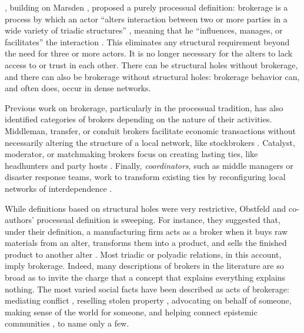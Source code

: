 \documentclass[
]{article}
\begin{document}
\textcite{obstfeldBrokerageProcessDecoupling2014}, building on Marsden \autocite*{marsdenBrokerageBehaviorRestricted1982}, proposed a purely processual definition: brokerage is a process by which an actor ``alters interaction between two or more parties in a wide variety of triadic structures'' \autocite[136]{obstfeldBrokerageProcessDecoupling2014}, meaning that he ``influences, manages, or facilitates'' the interaction \autocite[141]{obstfeldBrokerageProcessDecoupling2014}. This eliminates any structural requirement beyond the need for three or more actors. It is no longer necessary for the alters to lack access to or trust in each other. There can be structural holes without brokerage, and there can also be brokerage without structural holes: brokerage behavior can, and often does, occur in dense networks.

Previous work on brokerage, particularly in the processual tradition, has also identified categories of brokers depending on the nature of their activities. Middleman, transfer, or conduit brokers facilitate economic transactions without necessarily altering the structure of a local network, like stockbrokers \autocites[146]{stovelBrokerage2012}{spiroExtendedStructuresMediation2013}[141]{obstfeldBrokerageProcessDecoupling2014}. Catalyst, moderator, or matchmaking brokers focus on creating lasting ties, like headhunters and party hosts \autocites[146]{stovelBrokerage2012}{obstfeldBrokerageProcessDecoupling2014}{spiroExtendedStructuresMediation2013}. Finally, \emph{coordinators}, such as middle managers or disaster response teams, work to transform existing ties by reconfiguring local networks of interdependence \autocite[131-132]{spiroExtendedStructuresMediation2013}.

While definitions based on structural holes were very restrictive, Obstfeld and co-authors' processual definition is sweeping. For instance, they suggested that, under their definition, a manufacturing firm acts as a broker when it buys raw materials from an alter, transforms them into a product, and sells the finished product to another alter \autocite[145]{obstfeldBrokerageProcessDecoupling2014}. Most triadic or polyadic relations, in this account, imply brokerage. Indeed, many descriptions of brokers in the literature are so broad as to invite the charge that a concept that explains everything explains nothing. The most varied social facts have been described as acts of brokerage: mediating conflict \autocite{obstfeldBrokerageProcessDecoupling2014}, reselling stolen property \autocite{steffensmeierFenceShadowTwo1986}, advocating on behalf of someone, making sense of the world for someone, and helping connect epistemic communities \autocite[140]{stovelBrokerage2012}, to name only a few.
\end{document}
